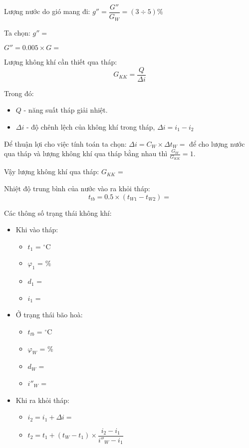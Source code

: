 Lượng nước do gió mang đi: $g'' = \dfrac{G''}{G_{W}} = (3\div 5)\%$

Ta chọn: $g'' = $
\begin{center}
	$G'' = 0.005\times G = $
\end{center}

Lượng không khí cần thiết qua tháp:
\begin{equation*}
	G_{KK} = \dfrac{Q}{\Delta i}
\end{equation*}

Trong đó:
\begin{itemize}
	\item $Q$ -  năng suất tháp giải nhiệt.
	\item $\Delta i$ - độ chênh lệch của không khí trong tháp, $\Delta i = i_{1} - i_{2}$
\end{itemize}

Để thuận lợi cho việc tính toán ta chọn: $\Delta i = C_{W}\times\Delta t_{W} = $ để cho lượng nước qua tháp và lượng
không khí qua tháp bằng nhau thì $\frac{G_{W}}{G_{KK}} = 1$.

Vậy lượng không khí qua tháp: $G_{KK}$ = 

Nhiệt độ trung bình của nước vào ra khỏi tháp:
\begin{equation*}
	t_{tb} = 0.5\times(t_{W1} - t_{W2}) = 
\end{equation*}

Các thông số trạng thái không khí:
\begin{itemize}[label={$\hexstar$}]
	\item Khi vào tháp:
	\begin{multicols}{2}
		\begin{itemize}[label={$\triangleright$}]
			\item $t_{1}$ = $^{\circ}$C
			\item $\varphi_{1}$ = \%
			\item $d_{1}$ = 
			\item $i_{1}$ = 
		\end{itemize}
	\end{multicols}

	\item Ở trạng thái bão hoà:
	\begin{multicols}{2}
		\begin{itemize}[label={$\triangleright$}]
			\item $t_{tb}$ = $^{\circ}$C
			\item $\varphi_{W}$ = \%
			\item $d_{W}$ = 
			\item $i''_{W}$ = 
		\end{itemize}
	\end{multicols}

	\item Khi ra khỏi tháp:
	\begin{itemize}[label={$\triangleright$}]
		\item $i_{2} = i_{1} + \Delta i = $
		\item $t_{2} = t_{1} + (t_{W}-t_{1})\times\dfrac{i_{2} - i_{1}}{i''_{W} - i_{1}}$
	\end{itemize}
\end{itemize}

